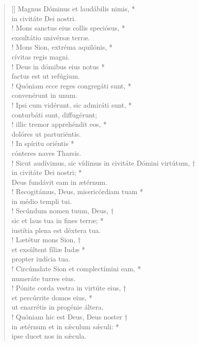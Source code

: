 \begin{verse}[\versewidth]
Magnus Dóminus et laudábilis nimis, *\\
in civitáte Dei nostri.\\!
\vin Mons sanctus eius collis speciósus, *\\
\vin exsultátio univérsæ terræ.\\!
Mons Sion, extréma aquilónis, *\\
cívitas regis magni.\\!
\vin Deus in dómibus eius notus *\\
\vin factus est ut refúgium.\\!
Quóniam ecce reges congregáti sunt, *\\
convenérunt in unum.\\!
\vin Ipsi cum vidérunt, sic admiráti sunt, *\\
\vin conturbáti sunt, diffugérunt;\\!
illic tremor apprehéndit eos, *\\
dolóres ut parturiéntis.\\!
\vin In spíritu oriéntis *\\
\vin cónteres naves Tharsis.\\!
Sicut audívimus, sic vídimus in civitáte Dómini virtútum, †\\
in civitáte Dei nostri; *\\
Deus fundávit eam in ætérnum.\\!
\vin Recogitámus, Deus, misericórdiam tuam *\\
\vin in médio templi tui.\\!
Secúndum nomen tuum, Deus, †\\
sic et laus tua in fines terræ; *\\
iustítia plena est déxtera tua.\\!
\vin Lætétur mons Sion, †\\
\vin et exsúltent fíliæ Iudæ *\\
\vin propter iudícia tua.\\!
Circúmdate Sion et complectímini eam, *\\
numeráte turres eius.\\!
\vin Pónite corda vestra in virtúte eius, †\\
\vin et percúrrite domos eius, *\\
\vin ut enarrétis in progénie áltera.\\!
Quóniam hic est Deus, Deus noster †\\
in ætérnum et in s\'{æ}culum s\'{æ}culi: *\\
ipse ducet nos in s\'{æ}cula.\\
\end{verse}
\vspace{1cm}


